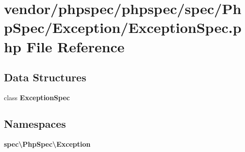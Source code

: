 \section{vendor/phpspec/phpspec/spec/\+Php\+Spec/\+Exception/\+Exception\+Spec.php File Reference}
\label{_exception_spec_8php}
\subsection*{Data Structures}
\begin{DoxyCompactItemize}
\item 
class {\bf Exception\+Spec}
\end{DoxyCompactItemize}
\subsection*{Namespaces}
\begin{DoxyCompactItemize}
\item 
 {\bf spec\textbackslash{}\+Php\+Spec\textbackslash{}\+Exception}
\end{DoxyCompactItemize}

